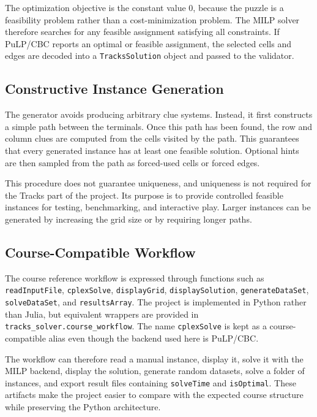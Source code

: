 The optimization objective is the constant value \(0\), because the puzzle is
a feasibility problem rather than a cost-minimization problem. The MILP solver
therefore searches for any feasible assignment satisfying all constraints. If
PuLP/CBC reports an optimal or feasible assignment, the selected cells and
edges are decoded into a \texttt{TracksSolution} object and passed to the
validator.

\subsection{Constructive Instance Generation}

The generator avoids producing arbitrary clue systems. Instead, it first
constructs a simple path between the terminals. Once this path has been found,
the row and column clues are computed from the cells visited by the path. This
guarantees that every generated instance has at least one feasible solution.
Optional hints are then sampled from the path as forced-used cells or forced
edges.

This procedure does not guarantee uniqueness, and uniqueness is not required
for the Tracks part of the project. Its purpose is to provide controlled
feasible instances for testing, benchmarking, and interactive play. Larger
instances can be generated by increasing the grid size or by requiring longer
paths.

\subsection{Course-Compatible Workflow}

The course reference workflow is expressed through functions such as
\texttt{readInputFile}, \texttt{cplexSolve}, \texttt{displayGrid},
\texttt{displaySolution}, \texttt{generateDataSet}, \texttt{solveDataSet}, and
\texttt{resultsArray}. The project is implemented in Python rather than
Julia, but equivalent wrappers are provided in
\texttt{tracks\_solver.course\_workflow}. The name \texttt{cplexSolve} is kept
as a course-compatible alias even though the backend used here is PuLP/CBC.

The workflow can therefore read a manual instance, display it, solve it with
the MILP backend, display the solution, generate random datasets, solve a
folder of instances, and export result files containing \texttt{solveTime} and
\texttt{isOptimal}. These artifacts make the project easier to compare with
the expected course structure while preserving the Python architecture.

